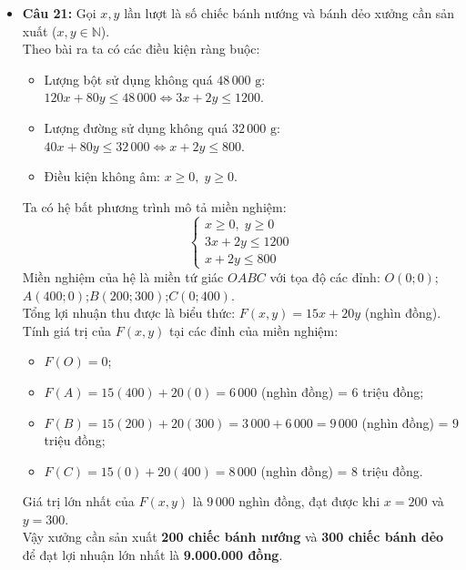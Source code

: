 \documentclass[12pt,a4paper]{article}
\begin{document}
\begin{itemize}[leftmargin=0.6cm, itemsep=2pt, topsep=1pt]
    \item \textbf{Câu 21:}
    Gọi $x, y$ lần lượt là số chiếc bánh nướng và bánh dẻo xưởng cần sản xuất ($x, y \in \mathbb{N}$).\\
    Theo bài ra ta có các điều kiện ràng buộc:
    \begin{itemize}[itemsep=1pt]
        \item Lượng bột sử dụng không quá $48\,000\text{ g}$: $120x + 80y \le 48\,000 \iff 3x + 2y \le 1200$.
        \item Lượng đường sử dụng không quá $32\,000\text{ g}$: $40x + 80y \le 32\,000 \iff x + 2y \le 800$.
        \item Điều kiện không âm: $x \ge 0,\; y \ge 0$.
    \end{itemize}
    Ta có hệ bất phương trình mô tả miền nghiệm:
    \[
    \begin{cases} x \ge 0,\; y \ge 0 \\ 3x + 2y \le 1200 \\ x + 2y \le 800 \end{cases}
    \]
    Miền nghiệm của hệ là miền tứ giác $OABC$ với tọa độ các đỉnh:
    $O(0; 0)$;\quad $A(400; 0)$;\quad $B(200; 300)$;\quad $C(0; 400)$.\\
    Tổng lợi nhuận thu được là biểu thức: $F(x, y) = 15x + 20y$ (nghìn đồng).\\
    Tính giá trị của $F(x, y)$ tại các đỉnh của miền nghiệm:
    \begin{itemize}[itemsep=1pt]
        \item $F(O) = 0$;
        \item $F(A) = 15(400) + 20(0) = 6\,000$ (nghìn đồng) = $6$ triệu đồng;
        \item $F(B) = 15(200) + 20(300) = 3\,000 + 6\,000 = 9\,000$ (nghìn đồng) = $9$ triệu đồng;
        \item $F(C) = 15(0) + 20(400) = 8\,000$ (nghìn đồng) = $8$ triệu đồng.
    \end{itemize}
    Giá trị lớn nhất của $F(x, y)$ là $9\,000$ nghìn đồng, đạt được khi $x = 200$ và $y = 300$.\\
    Vậy xưởng cần sản xuất \textbf{200 chiếc bánh nướng} và \textbf{300 chiếc bánh dẻo} để đạt lợi nhuận lớn nhất là \textbf{9.000.000 đồng}.


\end{itemize}
\end{document}
